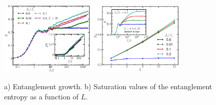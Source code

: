 \begin{figure}[h]
    \centering
    \includegraphics[width=0.4\textwidth]{imgs/S_FV_12a.png}
    \hspace{10 mm} 
    \includegraphics[width=0.4\textwidth]{imgs/S_FV_12b.png}
    \caption{
    \cite{bardarson_unbounded_2012}
        a) Entanglement growth.
        b) Saturation values of the entanglement entropy as a function of $L$.
    }
    \label{fig:Sga}
\end{figure}
